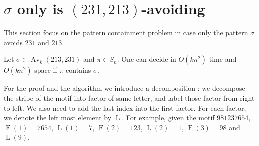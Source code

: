 \documentclass[a4paper]{llncs}
\DeclareMathOperator{\AV}{Av}
\DeclareMathOperator{\firsta}{L}
\newcommand{\first}[1]{\firsta({#1})}
\DeclareMathOperator{\factora}{F}
\newcommand{\factor}[1]{\factora({#1})}
\begin{document}

\section{$\sigma$ only is $(231,213)$-avoiding}
\label{section:sigma only avoid 231 and 213}

This section focus on the pattern containment problem
in case only the pattern $\sigma$ avoids $231$ and $213$.

\begin{proposition}
	\label{Proposition:sigma avoids 213 and 231}
	Let $\sigma \in \AV_k(213,231)$ and $\pi \in S_n$.
	One can decide in $O(kn^2)$ time
	and $O(kn^2)$ space if $\pi$ contains $\sigma$.
\end{proposition}

For the proof and the algorithm we introduce a decomposition : we decompose the stripe of the motif into factor of same letter, and label those factor from right to left. We also need to add the last index into the first factor. For each factor, we denote the left most element by $\firsta$. For example, given the motif $981237654$, $\factor{1} =7654$, $\first{1}=7$, $\factor{2}=123$, $\first{2}=1$, $\factor{3}=98$ and $\first{9}$.
\end{document}
